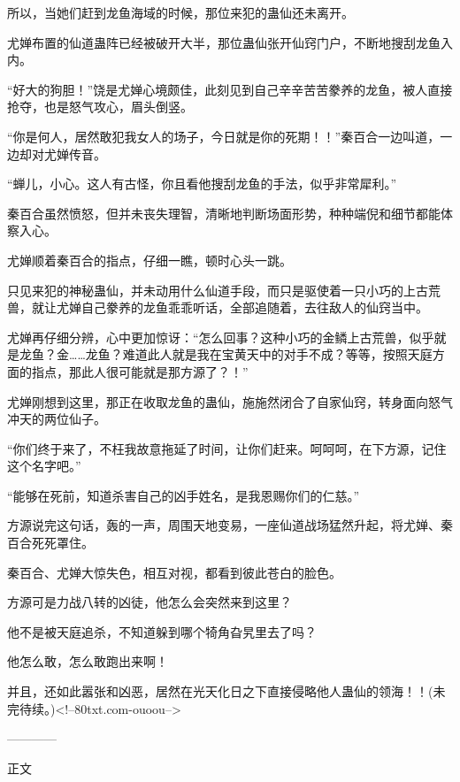 \begin{this_body}
所以，当她们赶到龙鱼海域的时候，那位来犯的蛊仙还未离开。

尤婵布置的仙道蛊阵已经被破开大半，那位蛊仙张开仙窍门户，不断地搜刮龙鱼入内。

“好大的狗胆！”饶是尤婵心境颇佳，此刻见到自己辛辛苦苦豢养的龙鱼，被人直接抢夺，也是怒气攻心，眉头倒竖。

“你是何人，居然敢犯我女人的场子，今日就是你的死期！！”秦百合一边叫道，一边却对尤婵传音。

“蝉儿，小心。这人有古怪，你且看他搜刮龙鱼的手法，似乎非常犀利。”

秦百合虽然愤怒，但并未丧失理智，清晰地判断场面形势，种种端倪和细节都能体察入心。

尤婵顺着秦百合的指点，仔细一瞧，顿时心头一跳。

只见来犯的神秘蛊仙，并未动用什么仙道手段，而只是驱使着一只小巧的上古荒兽，就让尤婵自己豢养的龙鱼乖乖听话，全部追随着，去往敌人的仙窍当中。

尤婵再仔细分辨，心中更加惊讶：“怎么回事？这种小巧的金鳞上古荒兽，似乎就是龙鱼？金……龙鱼？难道此人就是我在宝黄天中的对手不成？等等，按照天庭方面的指点，那此人很可能就是那方源了？！”

尤婵刚想到这里，那正在收取龙鱼的蛊仙，施施然闭合了自家仙窍，转身面向怒气冲天的两位仙子。

“你们终于来了，不枉我故意拖延了时间，让你们赶来。呵呵呵，在下方源，记住这个名字吧。”

“能够在死前，知道杀害自己的凶手姓名，是我恩赐你们的仁慈。”

方源说完这句话，轰的一声，周围天地变易，一座仙道战场猛然升起，将尤婵、秦百合死死罩住。

秦百合、尤婵大惊失色，相互对视，都看到彼此苍白的脸色。

方源可是力战八转的凶徒，他怎么会突然来到这里？

他不是被天庭追杀，不知道躲到哪个犄角旮旯里去了吗？

他怎么敢，怎么敢跑出来啊！

并且，还如此嚣张和凶恶，居然在光天化日之下直接侵略他人蛊仙的领海！！(未完待续。)<!--80txt.com-ouoou-->

------------

正文

\end{this_body}

